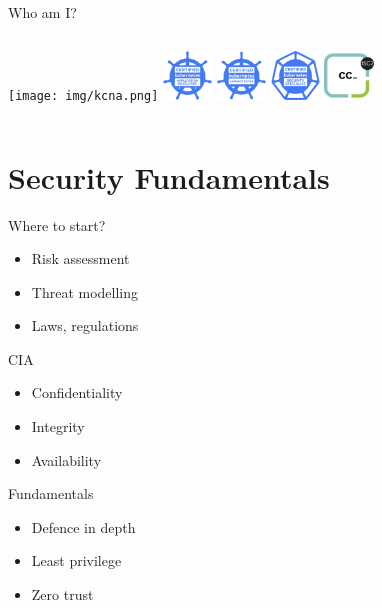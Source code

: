 \documentclass{dcpresentation}
\begin{document}
\begin{frame}{Who am I?}
 \begin{columns}
  \texttt{[image: img/kcna.png]}
  \includegraphics[height=1.3cm]{img/ckad.png}
  \includegraphics[height=1.3cm]{img/cka.png}
  \includegraphics[height=1.3cm]{img/cks.png}
  \includegraphics[height=1.3cm]{img/cc.png}
  \end{columns}
\end{frame}

\section{Security Fundamentals}

\begin{frame}{Where to start?}
 \begin{itemize}
  \item Risk assessment
  \item Threat modelling
  \item Laws, regulations
 \end{itemize}
\end{frame}

\begin{frame}{CIA}
 \begin{itemize}
  \item Confidentiality
  \item Integrity
  \item Availability
 \end{itemize}
\end{frame}

\begin{frame}{Fundamentals}
 \begin{itemize}
  \item Defence in depth
  \item Least privilege
  \item Zero trust
 \end{itemize}
\end{frame}
\end{document}
